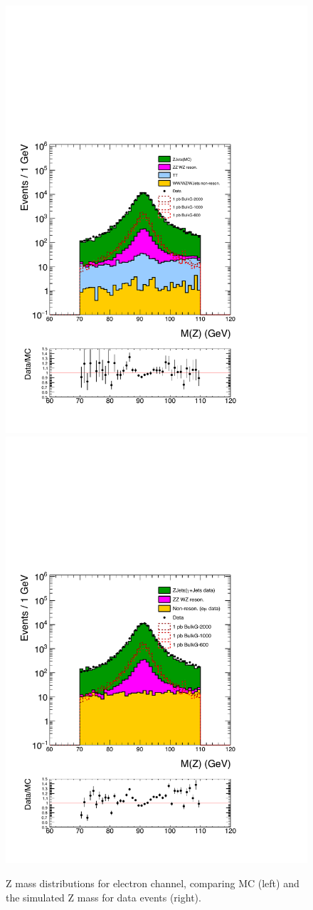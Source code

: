 \begin{figure}[htbp!]
\centering
\includegraphics[width=0.46\linewidth]{figures/MC2_Rc36p46DtReCalib_RhoWt_GMCEtaWt_tightzpt50_puWeightmoriondMC_metfilter_el_log_1pb.pdf}
\includegraphics[width=0.46\linewidth]{figures/GJets2_BkgSub_Rc36p46DtReCalib_NonReso_RhoWt_GMCEtaWt_tightzpt50_puWeightmoriondMC_muoneg_gjet_metfilter_el_log_1pb.pdf}
\caption{Z mass distributions for electron channel, comparing \Zjets MC (left) and the simulated Z mass for \gjets data events (right).}
\label{fig:mz_el_zjets_gjets}
\end{figure}

